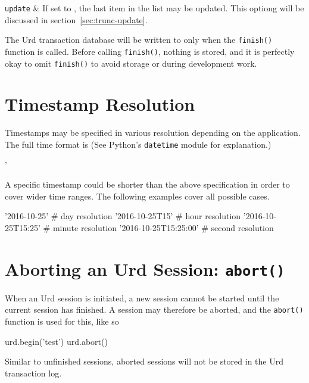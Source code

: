 \RPtwo \texttt{update} &  If set to \pyTrue, the last item in the list may be updated.
  This optiong will be discussed in section~\ref{sec:trunc-update}.\\[2ex]
\stoptabletwo

The Urd transaction database will be written to only when
the \texttt{finish()} function is called.  Before
calling \texttt{finish()}, nothing is stored, and it is perfectly okay
to omit \texttt{finish()} to avoid storage or during development work.







\section{Timestamp Resolution}

Timestamps may be specified in various resolution depending on the
application.  The full time format is (See Python's \texttt{datetime}
module for explanation.)
\begin{shell}
'%
\end{shell}
A specific timestamp could be shorter than the above specification in
order to cover wider time ranges.  The following examples cover all
possible cases.
\begin{python}
'2016-10-25'               # day resolution
'2016-10-25T15'            # hour resolution
'2016-10-25T15:25'         # minute resolution
'2016-10-25T15:25:00'      # second resolution
\end{python}





\section{Aborting an Urd Session:  \texttt{abort()}}

When an Urd session is initiated, a new session cannot be started
until the current session has finished.  A session may therefore be
aborted, and the \texttt{abort()} function is used for this, like so
\begin{python}
urd.begin('test')
urd.abort()
\end{python}
Similar to unfinished sessions, aborted sessions will not be stored in
the Urd transaction log.




